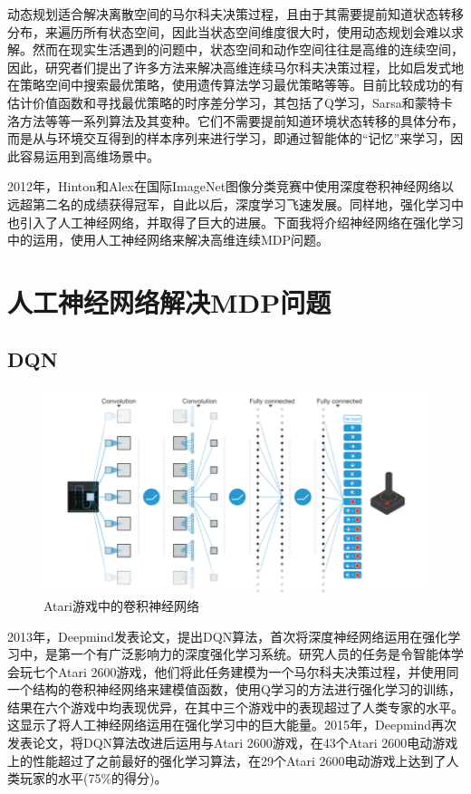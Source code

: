\documentclass[lang=cn,11pt,a4paper,cite=number]{elegantpaper}
\begin{document}
动态规划适合解决离散空间的马尔科夫决策过程，且由于其需要提前知道状态转移分布，来遍历所有状态空间，因此当状态空间维度很大时，使用动态规划会难以求解。然而在现实生活遇到的问题中，状态空间和动作空间往往是高维的连续空间，因此，研究者们提出了许多方法来解决高维连续马尔科夫决策过程，比如启发式地在策略空间中搜索最优策略，使用遗传算法学习最优策略等等。目前比较成功的有估计价值函数和寻找最优策略的时序差分学习，其包括了Q学习，Sarsa和蒙特卡洛方法等等一系列算法及其变种。它们不需要提前知道环境状态转移的具体分布，而是从与环境交互得到的样本序列来进行学习，即通过智能体的“记忆”来学习，因此容易运用到高维场景中。

2012年，Hinton和Alex在国际ImageNet图像分类竞赛中使用深度卷积神经网络以远超第二名的成绩获得冠军，自此以后，深度学习飞速发展。同样地，强化学习中也引入了人工神经网络，并取得了巨大的进展。下面我将介绍神经网络在强化学习中的运用，使用人工神经网络来解决高维连续MDP问题。

\section{人工神经网络解决MDP问题}
\subsection{DQN}
\begin{figure}
	\centering
	\includegraphics[width=1\linewidth]{figure/fig5}
	\caption{Atari游戏中的卷积神经网络\cite{journals/nature/MnihKSRVBGRFOPB15}}
	\label{fig:fig5}
\end{figure}

2013年，Deepmind发表论文\cite{mnih2013playing}，提出DQN算法，首次将深度神经网络运用在强化学习中，是第一个有广泛影响力的深度强化学习系统。研究人员的任务是令智能体学会玩七个Atari 2600游戏，他们将此任务建模为一个马尔科夫决策过程，并使用同一个结构的卷积神经网络来建模值函数，使用Q学习的方法进行强化学习的训练，结果在六个游戏中均表现优异，在其中三个游戏中的表现超过了人类专家的水平。这显示了将人工神经网络运用在强化学习中的巨大能量。2015年，Deepmind再次发表论文\cite{journals/nature/MnihKSRVBGRFOPB15}，将DQN算法改进后运用与Atari 2600游戏，在43个Atari 2600电动游戏上的性能超过了之前最好的强化学习算法，在29个Atari 2600电动游戏上达到了人类玩家的水平(75\%的得分)。
\end{document}
